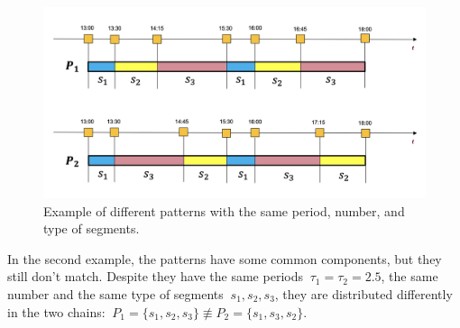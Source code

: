 \vspace{3mm}
\begin{figure}[H]
    \centering
    \includegraphics[width=0.7\linewidth]{images/pivot/patterns_2.PNG}
    \caption{Example of different patterns with the same period, number, and type of segments.}
    \label{fig:patterns_2}
\end{figure}
\vspace{3mm}

In the second example, the patterns have some common components, but they still don't match. Despite they have the same periods \(\ \tau_{1} = \tau_{2} = 2.5 \), the same number and the same type of segments \(\ s_{1}, s_{2}, s_{3} \), they are distributed differently in the two chains: \(\ P_{1} = \{ s_{1}, s_{2}, s_{3} \} \not\equiv P_{2} = \{ s_{1}, s_{3}, s_{2} \} \).
\vspace{5mm}

